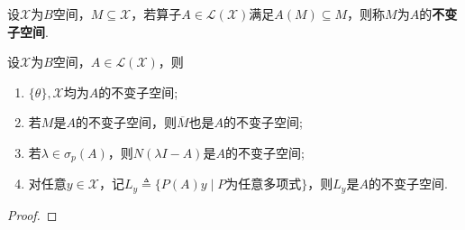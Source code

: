 \documentclass[../../main.tex]{subfiles}%
\begin{document}
\begin{definition}
设$\mathscr{X}$为$B$空间，$M\subseteq\mathscr{X}$，若算子$A\in\mathscr{L}(\mathscr{X})$满足$A(M)\subseteq M$，则称$M$为$A$的\textbf{不变子空间}.
\end{definition}
\begin{proposition}
设$\mathscr{X}$为$B$空间，$A\in\mathscr{L}(\mathscr{X})$，则
\begin{enumerate}[(1)]
\item $\{\theta\},\mathscr{X}$均为$A$的不变子空间;
\item 若$M$是$A$的不变子空间，则$\overline{M}$也是$A$的不变子空间;
\item 若$\lambda\in\sigma_p(A)$，则$N(\lambda I-A)$是$A$的不变子空间;
\item 对任意$y\in\mathscr{X}$，记$L_y\triangleq\{P(A)y\mid P\text{为任意多项式}\}$，则$L_y$是$A$的不变子空间.
\end{enumerate}
\end{proposition}
\begin{proof}


\end{proof}
\end{document}
